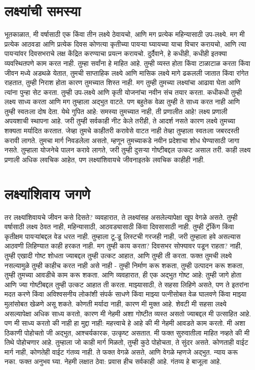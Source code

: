 \chapter{लक्ष्यांची समस्या}
भूतकाळात, मी वर्षासाठी एक किंवा तीन लक्ष्ये ठेवायचो, आणि मग प्रत्येक महिन्यासाठी उप-लक्ष्ये. मग मी प्रत्येक आठवडा आणि प्रत्येक दिवस कोणत्या कृतीच्या पायऱ्या घ्यायच्या याचा विचार करायचो, आणि त्या पायऱ्यांवर दिवसभराचे लक्ष केंद्रित करण्याचा प्रयत्न करायचो.
दुर्दैवाने, हे कधीही, कधीही इतक्या व्यवस्थितपणे काम करत नाही. तुम्हा सर्वांना हे माहित आहे. तुम्ही व्यस्त होता किंवा टाळाटाळ करता किंवा जीवन मध्ये अडथळे येतात, तुमची साप्ताहिक लक्ष्ये आणि मासिक लक्ष्ये मागे ढकलली जातात किंवा रांगेत राहतात, तुम्ही निराश होता कारण तुमच्यात शिस्त नाही. मग तुम्ही तुमच्या लक्ष्यांचा आढावा घेता आणि त्यांना पुन्हा सेट करता. तुम्ही उप-लक्ष्ये आणि कृती योजनांचा नवीन संच तयार करता.
कधीकधी तुम्ही लक्ष्य साध्य करता आणि मग तुम्हाला अद्भुत वाटते. पण बहुतेक वेळा तुम्ही ते साध्य करत नाही आणि तुम्ही स्वतःला दोष देता.
येथे गुपित आहे: समस्या तुमच्यात नाही, ती प्रणालीत आहे! लक्ष्य प्रणाली अपयशाची स्थापना आहे.
जरी तुम्ही सर्वकाही नीट केले तरीही, ते आदर्श नसते कारण लक्ष्ये तुमच्या शक्यता मर्यादित करतात. जेव्हा तुमचे काहीतरी करावेसे वाटत नाही तेव्हा तुम्हाला स्वतःला जबरदस्ती करावी लागते. तुमचा मार्ग निवडलेला असतो, म्हणून तुमच्याकडे नवीन प्रदेशाचा शोध घेण्यासाठी जागा नसते. तुम्हाला योजनेचे पालन करावे लागते, जरी तुम्ही दुसर्‍या गोष्टीबद्दल उत्कट असाल तरी.
काही लक्ष्य प्रणाली अधिक लवचिक आहेत, पण लक्ष्यांशिवायचे जीवनाइतके लवचिक काहीही नाही.

\chapter{लक्ष्यांशिवाय जगणे}
तर लक्ष्यांशिवायचे जीवन कसे दिसते? व्यवहारात, ते लक्ष्यांसह असलेल्यापेक्षा खूप वेगळे असते.
तुम्ही वर्षासाठी लक्ष्य ठेवत नाही, महिन्यासाठी, आठवड्यासाठी किंवा दिवसासाठी नाही. तुम्ही ट्रॅकिंग किंवा कृतीक्षम पायऱ्यांबद्दल वेड धरत नाही. तुम्हाला टू-डू लिस्टची गरजही नाही, जरी तुम्हाला हवे असल्यास आठवणी लिहिण्यात काही हरकत नाही.
मग तुम्ही काय करता? दिवसभर सोफ्यावर पडून राहता? नाही, तुम्ही एखादी गोष्ट शोधता ज्याबद्दल तुम्ही उत्कट आहात, आणि तुम्ही ती करता. फक्त तुमची लक्ष्ये नसल्यामुळे तुम्ही काहीच करत नाही असे नाही - तुम्ही निर्माण करू शकता, तुम्ही उत्पादन करू शकता, तुम्ही तुमच्या आवडीचे काम करू शकता.
आणि व्यवहारात, ही एक अद्भुत गोष्ट आहे: तुम्ही जागे होता आणि ज्या गोष्टीबद्दल तुम्ही उत्कट आहात ती करता. माझ्यासाठी, ते सहसा लिहिणे असते, पण ते इतरांना मदत करणे किंवा अविश्वसनीय लोकांशी संपर्क साधणे किंवा माझ्या पत्नीसोबत वेळ घालवणे किंवा माझ्या मुलांसोबत खेळणे असू शकते. कोणती मर्यादा नाही, कारण मी मुक्त आहे.
शेवटी मी सहसा लक्ष्ये असल्यापेक्षा अधिक साध्य करतो, कारण मी नेहमी अशा गोष्टीत व्यस्त असतो ज्याबद्दल मी उत्साहित आहे. पण मी साध्य करतो की नाही हा मुद्दा नाही: महत्त्वाचे हे आहे की मी नेहमी आवडते काम करतो.
मी अशा ठिकाणी पोहोचतो जी अद्भुत, आश्चर्यकारक, उत्कृष्ट असतात. मी फक्त सुरुवातीला माहित नव्हते की मी तिथे पोहोचणार आहे.
तुम्हाला जो काही मार्ग मिळतो, तुम्ही कुठे पोहोचता, ते सुंदर असते. कोणताही वाईट मार्ग नाही, कोणतेही वाईट गंतव्य नाही. ते फक्त वेगळे असते, आणि वेगळे म्हणजे अद्भुत. न्याय करू नका. फक्त अनुभव घ्या.
नेहमी लक्षात ठेवा: प्रवास हीच सर्वकाही आहे. गंतव्य हे बाजूला आहे.

